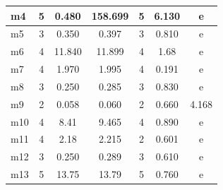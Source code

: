 \documentclass[headinclude, footinclude, abstract=on]{scrarticle}
\begin{document}
\begin{table}[H]
\begin{tabular}{l|ccc|ccc|}
\multicolumn{1}{|l|}{m4}  & \multicolumn{1}{c|}{5}            & \multicolumn{1}{c|}{0.480}           & 158.699        & \multicolumn{1}{c|}{5}            & \multicolumn{1}{c|}{6.130}           & e              \\ \hline
\multicolumn{1}{|l|}{m5}  & \multicolumn{1}{c|}{3}            & \multicolumn{1}{c|}{0.350}           & 0.397          & \multicolumn{1}{c|}{3}            & \multicolumn{1}{c|}{0.810}           & e              \\ \hline
\multicolumn{1}{|l|}{m6}  & \multicolumn{1}{c|}{4}            & \multicolumn{1}{c|}{11.840}          & 11.899         & \multicolumn{1}{c|}{4}            & \multicolumn{1}{c|}{1.68}            & e              \\ \hline
\multicolumn{1}{|l|}{m7}  & \multicolumn{1}{c|}{4}            & \multicolumn{1}{c|}{1.970}           & 1.995          & \multicolumn{1}{c|}{4}            & \multicolumn{1}{c|}{0.191}           & e              \\ \hline
\multicolumn{1}{|l|}{m8}  & \multicolumn{1}{c|}{3}            & \multicolumn{1}{c|}{0.250}           & 0.285          & \multicolumn{1}{c|}{3}            & \multicolumn{1}{c|}{0.830}           & e              \\ \hline
\multicolumn{1}{|l|}{m9}  & \multicolumn{1}{c|}{2}            & \multicolumn{1}{c|}{0.058}           & 0.060          & \multicolumn{1}{c|}{2}            & \multicolumn{1}{c|}{0.660}           & 4.168          \\ \hline
\multicolumn{1}{|l|}{m10} & \multicolumn{1}{c|}{4}            & \multicolumn{1}{c|}{8.41}            & 9.465          & \multicolumn{1}{c|}{4}            & \multicolumn{1}{c|}{0.890}           & e              \\ \hline
\multicolumn{1}{|l|}{m11} & \multicolumn{1}{c|}{4}            & \multicolumn{1}{c|}{2.18}            & 2.215          & \multicolumn{1}{c|}{2}            & \multicolumn{1}{c|}{0.601}           & e              \\ \hline
\multicolumn{1}{|l|}{m12} & \multicolumn{1}{c|}{3}            & \multicolumn{1}{c|}{0.250}           & 0.289          & \multicolumn{1}{c|}{3}            & \multicolumn{1}{c|}{0.610}           & e              \\ \hline
\multicolumn{1}{|l|}{m13} & \multicolumn{1}{c|}{5}            & \multicolumn{1}{c|}{13.75}           & 13.79          & \multicolumn{1}{c|}{5}            & \multicolumn{1}{c|}{0.760}           & e              \\ \hline

\end{tabular}
\end{table}
\end{document}
